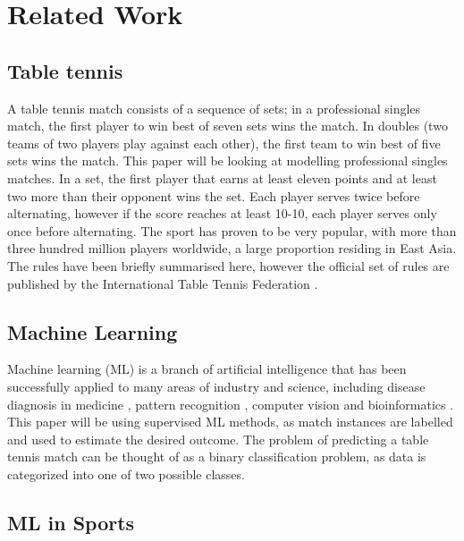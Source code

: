 \section{Related Work} \label{relatedwork}
\subsection{Table tennis}
A table tennis match consists of a sequence of sets; in a professional singles match, the first player to win best of seven sets wins the match. In doubles (two teams of two players play against each other), the first team to win best of five sets wins the match. This paper will be looking at modelling professional singles matches.
In a set, the first player that earns at least eleven points and at least two more than their opponent wins the set. Each player serves twice before alternating, however if the score reaches at least 10-10, each player serves only once before alternating.
The sport has proven to be very popular, with more than three hundred million players worldwide, a large proportion residing in East Asia.
The rules have been briefly summarised here, however the official set of rules are published by the International Table Tennis Federation \cite{ITTF}.


\subsection{Machine Learning}
Machine learning (ML) is a branch of artificial intelligence that has been successfully applied to many areas of industry and science, including disease diagnosis in medicine \cite{kourou2015machine}, pattern recognition \cite{weiss1989empirical}, computer vision \cite{khan2020machine} and bioinformatics \cite{larranaga2006machine}.
This paper will be using supervised ML methods, as match instances are labelled and used to estimate the desired outcome.
The problem of predicting a table tennis match can be thought of as a binary classification problem, as data is categorized into one of two possible classes.
\subsection{ML in Sports}

